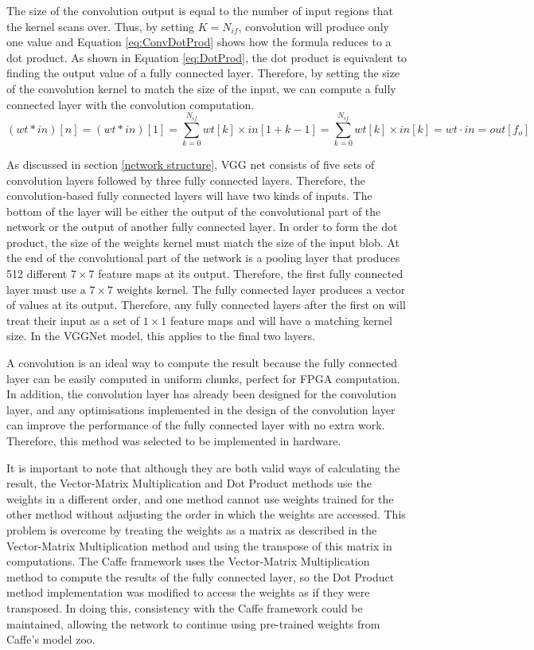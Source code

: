\documentclass[12pt]{article}
\begin{document}
The size of the convolution output is equal to the number of input regions that the kernel scans over. Thus, by setting $K = N_{if}$, convolution will produce only one value and Equation \ref{eq:ConvDotProd} shows how the formula reduces to a dot product\cite{fc2conv}. As shown in Equation \ref{eq:DotProd}, the dot product is equivalent to finding the output value of a fully connected layer. Therefore, by setting the size of the convolution kernel to match the size of the input, we can compute a fully connected layer with the convolution computation.
\begin{equation}
(wt*in)[n] = (wt*in)[1] = \sum^{N_{if}}_{k=0} wt[k]\times in[1 + k - 1] 
= \sum^{N_{if}}_{k=0} wt[k]\times in[k] = wt \cdot in = out[f_o]
\label{eq:ConvDotProd}
\end{equation}

As discussed in section \ref{network structure}, VGG net consists of five sets of convolution layers followed by three fully connected layers. Therefore, the convolution-based fully connected layers will have two kinds of inputs. The bottom of the layer will be either the output of the convolutional part of the network or the output of another fully connected layer. In order to form the dot product, the size of the weights kernel must match the size of the input blob. At the end of the convolutional part of the network is a pooling layer that produces 512 different $7 \times 7$ feature maps at its output. Therefore, the first fully connected layer must use a $7 \times 7$ weights kernel. The fully connected layer produces a vector of values at its output. Therefore, any fully connected layers after the first on will treat their input as a set of $1 \times 1$ feature maps and will have a matching kernel size. In the VGGNet model, this applies to the final two layers.

A convolution is an ideal way to compute the result because the fully connected layer can be easily computed in uniform chunks, perfect for FPGA computation. In addition, the convolution layer has already been designed for the convolution layer, and any optimisations implemented in the design of the convolution layer can improve the performance of the fully connected layer with no extra work. Therefore, this method was selected to be implemented in hardware.

It is important to note that although they are both valid ways of calculating the result, the Vector-Matrix Multiplication and Dot Product methods use the weights in a different order, and one method cannot use weights trained for the other method without adjusting the order in which the weights are accessed. This problem is overcome by treating the weights as a matrix as described in the Vector-Matrix Multiplication method and using the transpose of this matrix in computations. The Caffe framework uses the Vector-Matrix Multiplication method to compute the results of the fully connected layer, so the Dot Product method implementation was modified to access the weights as if they were transposed. In doing this, consistency with the Caffe framework could be maintained, allowing the network to continue using pre-trained weights from Caffe's model zoo.
\end{document}
